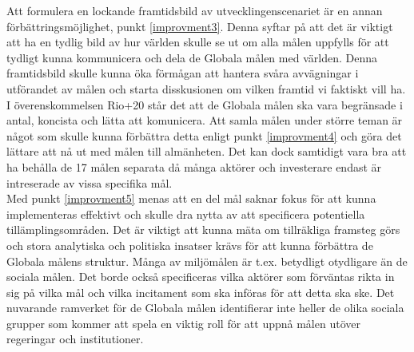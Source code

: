 \documentclass{report}
\begin{document}
Att formulera en lockande framtidsbild av utvecklingenscenariet är en annan förbättringsmöjlighet, punkt \ref{improvment3}. Denna syftar på att det är viktigt att ha en tydlig bild av hur världen skulle se ut om alla målen uppfylls för att tydligt kunna kommunicera och dela de Globala målen med världen. Denna framtidsbild skulle kunna öka förmågan att hantera svåra avvägningar i utförandet av målen och starta disskusionen om vilken framtid vi faktiskt vill ha.\cite{webCostanza1}\\

I överenskommelsen Rio+20 står det att de Globala målen ska vara begränsade i antal, koncista och lätta att komunicera. Att samla målen under större teman är något som skulle kunna förbättra detta enligt punkt \ref{improvment4} och göra det lättare att nå ut med målen till almänheten. Det kan dock samtidigt vara bra att ha behålla de 17 målen separata då många aktörer och investerare endast är intreserade av vissa specifika mål. \cite{review}\\

Med punkt \ref{improvment5} menas att en del mål saknar fokus för att kunna implementeras effektivt och skulle dra nytta av att specificera potentiella tillämplingsområden. Det är viktigt att kunna mäta om tillräkliga framsteg görs och stora analytiska och politiska insatser krävs för att kunna förbättra de Globala målens struktur. Många av miljömålen  är t.ex. betydligt otydligare än de sociala målen. Det borde också specificeras vilka aktörer som förväntas rikta in sig på vilka mål och vilka incitament som ska införas för att detta ska ske. Det nuvarande ramverket för de Globala målen identifierar inte heller de olika sociala grupper som kommer att spela en viktig roll för att uppnå målen utöver regeringar och institutioner. \cite{review}\\



\newpage
\end{document}
